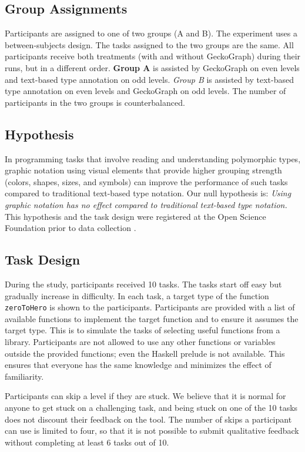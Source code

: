 \documentclass[preprint,12pt]{elsarticle}
\begin{document}
\subsection{Group Assignments}

Participants are assigned to one of two groups (A and B). The experiment uses a between-subjects design.  The tasks assigned to the two groups are the same. All participants receive both treatments (with and without GeckoGraph) during their runs, but in a different order.   {\bf Group A} is assisted by GeckoGraph on even levels and text-based type annotation on odd levels. {\it Group B} is assisted by text-based type annotation on even levels and GeckoGraph on odd levels. The number of participants in the two groups is counterbalanced.

\subsection{Hypothesis}
In programming tasks that involve reading and understanding polymorphic types, graphic notation using visual elements that provide higher grouping strength (colors, shapes, sizes, and symbols) can improve the performance of such tasks compared to traditional text-based type notation. Our null hypothesis is: {\it Using graphic notation has no effect compared to traditional text-based type notation.} This hypothesis and the task design were registered at the Open Science Foundation prior to data collection \cite{Stuckey2023-vl}. 

\subsection{Task Design} \label{subsection:task}
During the study, participants received 10 tasks. The tasks start off easy but gradually increase in difficulty.  In each task, a target type of the function \texttt{zeroToHero} is shown to the participants. Participants are provided with a list of available functions to implement the target function and to ensure it assumes the target type. This is to simulate the tasks of selecting useful functions from a library. Participants are not allowed to use any other functions or variables outside the provided functions; even the Haskell prelude is not available. This ensures that everyone has the same knowledge and minimizes the effect of familiarity. 

Participants can skip a level if they are stuck. We believe that it is normal for anyone to get stuck on a challenging task, and being stuck on one of the 10 tasks does not discount their feedback on the tool. The number of skips a participant can use is limited to four, so that it is not possible to submit qualitative feedback without completing at least 6 tasks out of 10. 
\end{document}
